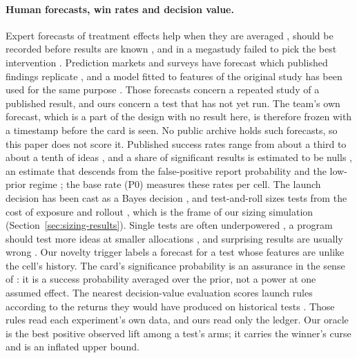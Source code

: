 \paragraph{Human forecasts, win rates and decision value.}
Expert forecasts of treatment effects help when they are averaged \cite{dellavigna2018predicting}, should be recorded before results are known \cite{dellavigna2019predict}, and in a megastudy failed to pick the best intervention \cite{milkman2021megastudies}. Prediction markets and surveys have forecast which published findings replicate \cite{dreber2015using,camerer2018evaluating}, and a model fitted to features of the original study has been used for the same purpose \cite{altmejd2019predicting}. Those forecasts concern a repeated study of a published result, and ours concern a test that has not yet run. The team's own forecast, which is a part of the design with no result here, is therefore frozen with a timestamp before the card is seen. No public archive holds such forecasts, so this paper does not score it. Published success rates range from about a third to about a tenth of ideas \cite{kohavi2022intuition,kohavi2009controlled,kohavi2013online,larsen2022statistical}, and a share of significant results is estimated to be nulls \cite{berman2022false}, an estimate that descends from the false-positive report probability \cite{wacholder2004assessing} and the low-prior regime \cite{ioannidis2005why}; the base rate (P0) measures these rates per cell. The launch decision has been cast as a Bayes decision \cite{goldberg2017decision}, and test-and-roll sizes tests from the cost of exposure and rollout \cite{feit2019test}, which is the frame of our sizing simulation (Section~\ref{sec:sizing-results}). Single tests are often underpowered \cite{lewis2015unfavorable}, a program should test more ideas at smaller allocations \cite{sudijono2024optimizing}, and surprising results are usually wrong \cite{kohavi2020trustworthy}. Our novelty trigger labels a forecast for a test whose features are unlike the cell's history. The card's significance probability is an assurance in the sense of \cite{ohagan2005assurance}: it is a success probability averaged over the prior, not a power at one assumed effect. The nearest decision-value evaluation scores launch rules according to the returns they would have produced on historical tests \cite{chou2025evaluating}. Those rules read each experiment's own data, and ours read only the ledger. Our oracle is the best positive observed lift among a test's arms; it carries the winner's curse \cite{lee2018winners} and is an inflated upper bound.

